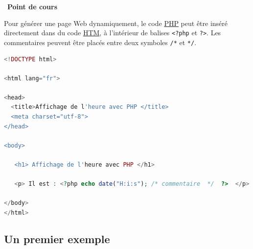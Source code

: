 \documentclass[
  11pt,
]{article}
\newcommand{\passthrough}[1]{#1}
\newcounter{cours}
\newenvironment{cours}[1]
{\par \medskip   \addtocounter{cours}{1} \noindent  
\begin{bclogo}[arrondi =0.1,  ombre = true, barre=none, logo=\bcbook, marge=4]{~\textbf{Point de cours} \textbf{\thecours} {\itshape #1} }  \par}
{
\end{bclogo}
 \par \bigskip }
\begin{document}
\begin{cours}{}
Pour générer une page Web dynamiquement, le code
\href{https://developer.mozilla.org/fr/docs/Glossaire/PHP}{PHP} peut
être inséré directement dans du code
\href{https://developer.mozilla.org/fr/docs/Glossaire/HTML}{HTM}, à
l'intérieur de balises \passthrough{\lstinline!<?php!} et
\passthrough{\lstinline!?>!}. Les commentaires peuvent être placés entre
deux symboles \passthrough{\lstinline!/*!} et
\passthrough{\lstinline!*/!}.

\begin{lstlisting}[language=PHP]
<!DOCTYPE html>

<html lang="fr">

<head>
  <title>Affichage de l'heure avec PHP </title>
  <meta charset="utf-8">    
</head>

<body>

   <h1> Affichage de l'heure avec PHP </h1>
   
   <p> Il est : <?php echo date("H:i:s"); /* commentaire  */  ?>  </p>

</body>
</html> 
\end{lstlisting}

\end{cours}

\hypertarget{un-premier-exemple}{%
\subsection{Un premier exemple}\label{un-premier-exemple}}
\end{document}
